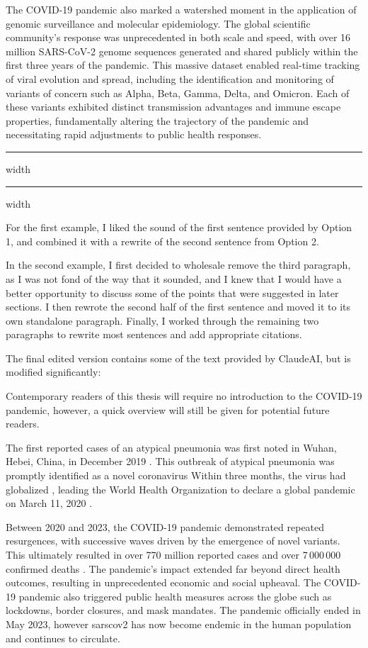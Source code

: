 The COVID-19 pandemic also marked a watershed moment in the application of genomic surveillance and molecular epidemiology. The global scientific community's response was unprecedented in both scale and speed, with over 16 million SARS-CoV-2 genome sequences generated and shared publicly within the first three years of the pandemic. This massive dataset enabled real-time tracking of viral evolution and spread, including the identification and monitoring of variants of concern such as Alpha, Beta, Gamma, Delta, and Omicron. Each of these variants exhibited distinct transmission advantages and immune escape properties, fundamentally altering the trajectory of the pandemic and necessitating rapid adjustments to public health responses.
\hrule width \hsize \kern 1mm \hrule width \hsize
\vspace{2em}

For the first example, I liked the sound of the first sentence provided by Option 1, and combined it with a rewrite of the second sentence from Option 2.

In the second example, I first decided to wholesale remove the third paragraph, as I was not fond of the way that it sounded, and I knew that I would have a better opportunity to discuss some of the points that were suggested in later sections.
I then rewrote the second half of the first sentence and moved it to its own standalone paragraph.
Finally, I worked through the remaining two paragraphs to rewrite most sentences and add appropriate citations.

The final edited version contains some of the text provided by ClaudeAI, but is modified significantly:

Contemporary readers of this thesis will require no introduction to the COVID-19 pandemic, however, a quick overview will still be given for potential future readers.

The first reported cases of an atypical pneumonia was first noted in Wuhan, Hebei, China, in December 2019 \citep{zhou2020pneumonia}.
This outbreak of atypical pneumonia was promptly identified as a novel coronavirus \citep{wu2020new}
Within three months, the virus had globalized \cite{dong2020interactive}, leading the World Health Organization to declare a global pandemic on March 11, 2020 \cite{healthorganization2020coronavirus}.

Between 2020 and 2023, the COVID-19 pandemic demonstrated repeated resurgences, with successive waves driven by the emergence of novel variants.
This ultimately resulted in over 770 million reported cases and over 7\,000\,000 confirmed deaths \citep{ourworldindata-covid-explorer}.
The pandemic's impact extended far beyond direct health outcomes, resulting in unprecedented economic and social upheaval.
The COVID-19 pandemic also triggered public health measures across the globe such as  lockdowns, border closures, and mask mandates.
The pandemic officially ended in May 2023, however \gls{sarscov2} has now become endemic in the human population and continues to circulate.


\cleardoublepage

